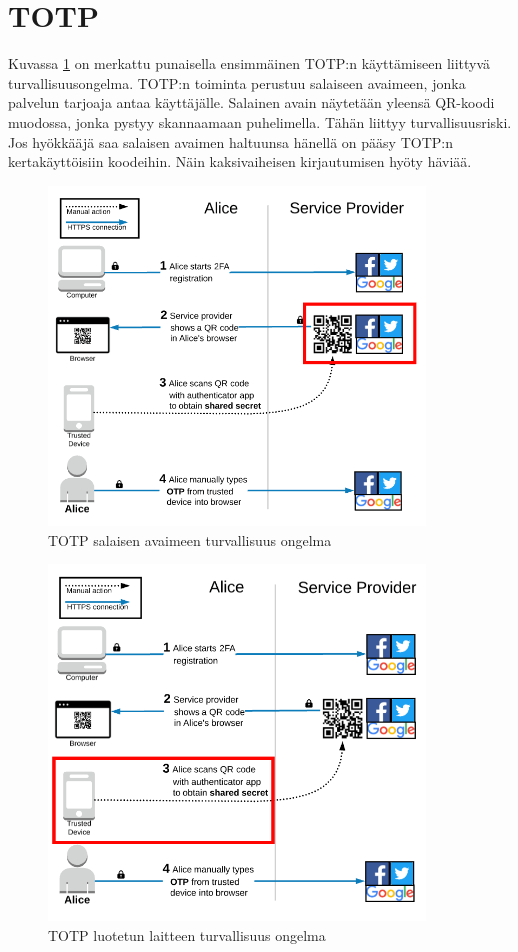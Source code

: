 \section{TOTP}

Kuvassa \ref{fig:TOTP_service_provider} on merkattu punaisella ensimmäinen TOTP:n käyttämiseen liittyvä turvallisuusongelma. TOTP:n toiminta perustuu salaiseen avaimeen, jonka palvelun tarjoaja antaa käyttäjälle. Salainen avain näytetään yleensä QR-koodi muodossa, jonka pystyy skannaamaan puhelimella. Tähän liittyy turvallisuusriski. Jos hyökkääjä saa salaisen avaimen haltuunsa hänellä on pääsy TOTP:n kertakäyttöisiin koodeihin. Näin kaksivaiheisen kirjautumisen hyöty häviää.

\begin{figure}[ht]
    \centering
    \includegraphics[width=10cm]{template/figures/TOTP service-provider-compromise.png}
    \caption{TOTP salaisen avaimeen turvallisuus ongelma \citep{TOTP}}
    \label{fig:TOTP_service_provider}
\end{figure}

\begin{figure}
    \centering
    \includegraphics[width=10cm]{template/figures/TOTP trusted-device-compromise.png}
    \caption{TOTP luotetun laitteen turvallisuus ongelma \citep{TOTP}}
    \label{fig:TOTP_device}
\end{figure}

